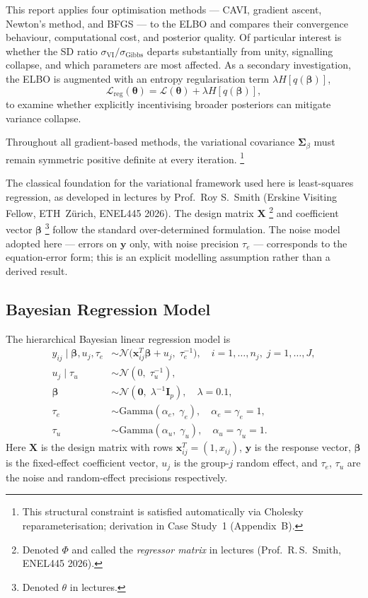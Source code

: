 \documentclass[11pt,a4paper]{article}
\newcommand{\N}{\mathcal{N}}
\begin{document}
This report applies four optimisation methods --- CAVI, gradient ascent, Newton's
method, and BFGS --- to the ELBO and compares their convergence behaviour,
computational cost, and posterior quality.
Of particular interest is whether the SD ratio
$\sigma_{\mathrm{VI}}/\sigma_{\mathrm{Gibbs}}$ departs substantially from unity,
signalling collapse, and which parameters are most affected.
As a secondary investigation, the ELBO is augmented with an entropy regularisation term $\lambda H[q(\bm{\beta})]$,
\begin{equation*}
    \mathcal{L}_{\mathrm{reg}}(\bm{\theta}) = \mathcal{L}(\bm{\theta}) + \lambda H[q(\bm{\beta})],
\end{equation*}
to examine whether explicitly incentivising broader posteriors can mitigate variance collapse.

Throughout all gradient-based methods, the variational covariance $\bm{\Sigma}_\beta$
must remain symmetric positive definite at every iteration.%
\footnote{This structural constraint is satisfied automatically via Cholesky
reparameterisation; derivation in Case Study~1 (Appendix~B).}

The classical foundation for the variational framework used here is least-squares
regression, as developed in lectures by Prof.\ Roy S.\ Smith (Erskine Visiting Fellow,
ETH~Z\"{u}rich, ENEL445 2026).
The design matrix $\bm{X}$%
\footnote{Denoted $\Phi$ and called the \emph{regressor matrix} in lectures
(Prof.\ R.\,S.\ Smith, ENEL445 2026).}
and coefficient vector $\bm{\beta}$%
\footnote{Denoted $\theta$ in lectures.}
follow the standard over-determined formulation.
The noise model adopted here --- errors on $\bm{y}$ only, with noise precision
$\tau_e$ --- corresponds to the equation-error form; this is an explicit modelling
assumption rather than a derived result.

\subsection{Bayesian Regression Model}

The hierarchical Bayesian linear regression model is
\begin{align}
y_{ij} \mid \bm{\beta}, u_j, \tau_e
  &\sim \mathcal{N}\!\bigl(\mathbf{x}_{ij}^T\bm{\beta} + u_j,\; \tau_e^{-1}\bigr),
  \quad i=1,\ldots,n_j,\; j=1,\ldots,J, \\
u_j \mid \tau_u &\sim \mathcal{N}(0,\; \tau_u^{-1}), \\
\bm{\beta} &\sim \N(\bm{0},\; \lambda^{-1}\bm{I}_p), \quad \lambda=0.1, \\
\tau_e &\sim \mathrm{Gamma}(\alpha_e,\; \gamma_e), \quad \alpha_e=\gamma_e=1, \\
\tau_u &\sim \mathrm{Gamma}(\alpha_u,\; \gamma_u), \quad \alpha_u=\gamma_u=1.
\end{align}
Here $\bm{X}$ is the design matrix with rows $\mathbf{x}_{ij}^T = (1, x_{ij})$,
$\mathbf{y}$ is the response vector, $\bm{\beta}$ is the fixed-effect coefficient
vector, $u_j$ is the group-$j$ random effect, and $\tau_e$, $\tau_u$ are the
noise and random-effect precisions respectively.
\end{document}
